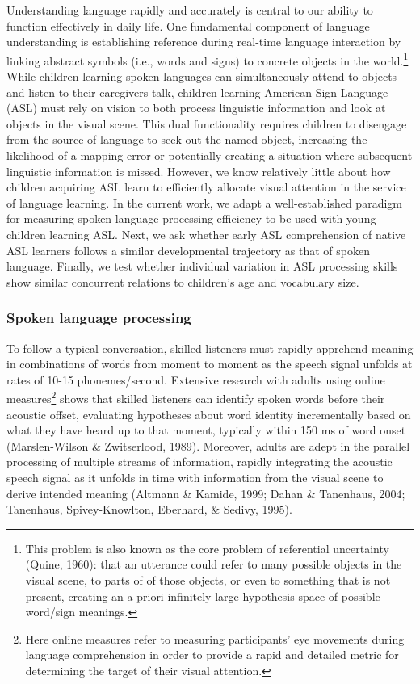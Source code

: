 \documentclass[12pt,]{article}
\let\rmarkdownfootnote\footnote%
\def\footnote{\protect\rmarkdownfootnote}
\begin{document}
Understanding language rapidly and accurately is central to our ability
to function effectively in daily life. One fundamental component of
language understanding is establishing reference during real-time
language interaction by linking abstract symbols (i.e., words and signs)
to concrete objects in the world.\footnote{This problem is also known as
  the core problem of referential uncertainty (Quine, 1960): that an
  utterance could refer to many possible objects in the visual scene, to
  parts of of those objects, or even to something that is not present,
  creating an a priori infinitely large hypothesis space of possible
  word/sign meanings.} While children learning spoken languages can
simultaneously attend to objects and listen to their caregivers talk,
children learning American Sign Language (ASL) must rely on vision to
both process linguistic information and look at objects in the visual
scene. This dual functionality requires children to disengage from the
source of language to seek out the named object, increasing the
likelihood of a mapping error or potentially creating a situation where
subsequent linguistic information is missed. However, we know relatively
little about how children acquiring ASL learn to efficiently allocate
visual attention in the service of language learning. In the current
work, we adapt a well-established paradigm for measuring spoken language
processing efficiency to be used with young children learning ASL. Next,
we ask whether early ASL comprehension of native ASL learners follows a
similar developmental trajectory as that of spoken language. Finally, we
test whether individual variation in ASL processing skills show similar
concurrent relations to children's age and vocabulary size.

\subsubsection{Spoken language
processing}\label{spoken-language-processing}

To follow a typical conversation, skilled listeners must rapidly
apprehend meaning in combinations of words from moment to moment as the
speech signal unfolds at rates of 10-15 phonemes/second. Extensive
research with adults using online measures\footnote{Here online measures
  refer to measuring participants' eye movements during language
  comprehension in order to provide a rapid and detailed metric for
  determining the target of their visual attention.} shows that skilled
listeners can identify spoken words before their acoustic offset,
evaluating hypotheses about word identity incrementally based on what
they have heard up to that moment, typically within 150 ms of word onset
(Marslen-Wilson \& Zwitserlood, 1989). Moreover, adults are adept in the
parallel processing of multiple streams of information, rapidly
integrating the acoustic speech signal as it unfolds in time with
information from the visual scene to derive intended meaning (Altmann \&
Kamide, 1999; Dahan \& Tanenhaus, 2004; Tanenhaus, Spivey-Knowlton,
Eberhard, \& Sedivy, 1995).
\end{document}
